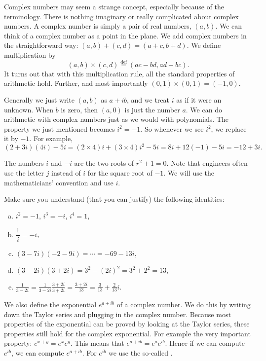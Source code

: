 Complex numbers may seem a strange concept, especially because of the
terminology.  There is nothing imaginary or really complicated about complex
numbers.
A complex number is simply a pair of real numbers, $(a,b)$.  We can
think of a complex number as a point in the plane.  We add complex numbers
in the straightforward way: $(a,b)+(c,d)=(a+c,b+d)$.  We define
multiplication by
\begin{equation*}
(a,b) \times (c,d) \overset{\text{def}}{=} (ac-bd,ad+bc) .
\end{equation*}
It turns out that with this multiplication rule, all the standard properties
of arithmetic hold.  Further, and most importantly $(0,1) \times (0,1) =
(-1,0)$.

Generally we just write $(a,b)$ as $a+ib$, and we treat $i$ as if it were an
unknown.  When $b$ is zero, then $(a,0)$ is just the number $a$.
We can do arithmetic with complex numbers just as we would
with polynomials.
The property we just mentioned becomes $i^2 = -1$.
So whenever we see $i^2$, we replace it by $-1$.
For example,
\begin{equation*}
(2+3i)(4i) - 5i = 
(2\times 4)i + (3 \times 4) i^2 - 5i
=
8i + 12 (-1) - 5i
=
-12 + 3i .
\end{equation*}

The numbers
$i$ and $-i$ are the two roots of $r^2 + 1 = 0$.
Note that engineers often use the letter $j$ instead of $i$ for the square
root of $-1$.  We will use the mathematicians' convention and use $i$.

\begin{exercise}
Make sure you understand (that you can justify)
the following identities:
\begin{enumerate}[a)]
\item $i^2 = -1$, $i^3 = -i$, $i^4 = 1$,
\item $\dfrac{1}{i} = -i$,
\item $(3-7i)(-2-9i) = \cdots = -69-13i$,
\item $(3-2i)(3+2i) = 3^2 - {(2i)}^2 = 3^2 + 2^2 = 13$,
\item $\frac{1}{3-2i} = \frac{1}{3-2i} \frac{3+2i}{3+2i} = \frac{3+2i}{13}
= \frac{3}{13}+\frac{2}{13}i$.
\end{enumerate}
\end{exercise}

We also define the exponential $e^{a+ib}$ of a complex number.  We do
this by writing down the Taylor series and plugging in the complex
number.  Because most properties of the exponential can be proved by looking
at the Taylor series, these
properties still hold for the complex
exponential.  For example the very important property: $e^{x+y} = e^x e^y$.  This means that
$e^{a+ib} = e^a e^{ib}$.  Hence if we can compute $e^{ib}$, we can
compute $e^{a+ib}$.  For $e^{ib}$ we use the so-called
\emph{}.

